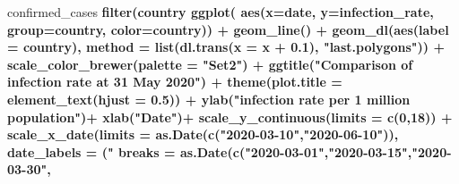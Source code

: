 \documentclass[
]{article}
\newenvironment{Shaded}{\begin{snugshade}}{\end{snugshade}}
\newcommand{\DataTypeTok}[1]{\textcolor[rgb]{0.13,0.29,0.53}{#1}}
\newcommand{\DecValTok}[1]{\textcolor[rgb]{0.00,0.00,0.81}{#1}}
\newcommand{\FloatTok}[1]{\textcolor[rgb]{0.00,0.00,0.81}{#1}}
\newcommand{\KeywordTok}[1]{\textcolor[rgb]{0.13,0.29,0.53}{\textbf{#1}}}
\newcommand{\NormalTok}[1]{#1}
\newcommand{\OperatorTok}[1]{\textcolor[rgb]{0.81,0.36,0.00}{\textbf{#1}}}
\newcommand{\StringTok}[1]{\textcolor[rgb]{0.31,0.60,0.02}{#1}}
\begin{document}
\begin{Shaded}
\begin{Highlighting}[]
\NormalTok{confirmed_cases }\OperatorTok{%>%}
\StringTok{  }\KeywordTok{filter}\NormalTok{(country }\OperatorTok{%in%}\StringTok{ }\KeywordTok{c}\NormalTok{(}\StringTok{"Angola"}\NormalTok{,}\StringTok{"Botswana"}\NormalTok{,}\StringTok{"Lesotho"}\NormalTok{,}\StringTok{"Malawi"}\NormalTok{,}\StringTok{"Zimbabwe"}\NormalTok{,}\StringTok{"Namibia"}\NormalTok{,}\StringTok{"Mozambique"}\NormalTok{), date}\OperatorTok{<}\StringTok{"2020-06-01"}\NormalTok{)}\OperatorTok{%>%}
\StringTok{  }\KeywordTok{ggplot}\NormalTok{( }\KeywordTok{aes}\NormalTok{(}\DataTypeTok{x=}\NormalTok{date, }\DataTypeTok{y=}\NormalTok{infection_rate, }\DataTypeTok{group=}\NormalTok{country, }\DataTypeTok{color=}\NormalTok{country)) }\OperatorTok{+}
\StringTok{  }\KeywordTok{geom_line}\NormalTok{() }\OperatorTok{+}\StringTok{ }
\StringTok{   }\KeywordTok{geom_dl}\NormalTok{(}\KeywordTok{aes}\NormalTok{(}\DataTypeTok{label =}\NormalTok{ country), }
          \DataTypeTok{method =} \KeywordTok{list}\NormalTok{(}\KeywordTok{dl.trans}\NormalTok{(}\DataTypeTok{x =}\NormalTok{ x }\OperatorTok{+}\StringTok{ }\FloatTok{0.1}\NormalTok{), }\StringTok{"last.polygons"}\NormalTok{)) }\OperatorTok{+}
\StringTok{  }\KeywordTok{scale_color_brewer}\NormalTok{(}\DataTypeTok{palette =} \StringTok{"Set2"}\NormalTok{) }\OperatorTok{+}
\StringTok{  }\KeywordTok{ggtitle}\NormalTok{(}\StringTok{"Comparison of infection rate at 31 May 2020"}\NormalTok{) }\OperatorTok{+}
\StringTok{  }\KeywordTok{theme}\NormalTok{(}\DataTypeTok{plot.title =} \KeywordTok{element_text}\NormalTok{(}\DataTypeTok{hjust =} \FloatTok{0.5}\NormalTok{)) }\OperatorTok{+}
\StringTok{  }\KeywordTok{ylab}\NormalTok{(}\StringTok{"infection rate per 1 million population"}\NormalTok{)}\OperatorTok{+}
\StringTok{  }\KeywordTok{xlab}\NormalTok{(}\StringTok{"Date"}\NormalTok{)}\OperatorTok{+}
\StringTok{  }\KeywordTok{scale_y_continuous}\NormalTok{(}\DataTypeTok{limits =} \KeywordTok{c}\NormalTok{(}\DecValTok{0}\NormalTok{,}\DecValTok{18}\NormalTok{)) }\OperatorTok{+}
\StringTok{  }\KeywordTok{scale_x_date}\NormalTok{(}\DataTypeTok{limits =} \KeywordTok{as.Date}\NormalTok{(}\KeywordTok{c}\NormalTok{(}\StringTok{"2020-03-10"}\NormalTok{,}\StringTok{"2020-06-10"}\NormalTok{)),}
               \DataTypeTok{date_labels =}\NormalTok{ (}\StringTok{"%b %d"}\NormalTok{),}
               \DataTypeTok{breaks =} \KeywordTok{as.Date}\NormalTok{(}\KeywordTok{c}\NormalTok{(}\StringTok{"2020-03-01"}\NormalTok{,}\StringTok{"2020-03-15"}\NormalTok{,}\StringTok{"2020-03-30"}\NormalTok{,}
}}}
\end{Highlighting}
\end{Shaded}
\end{document}
